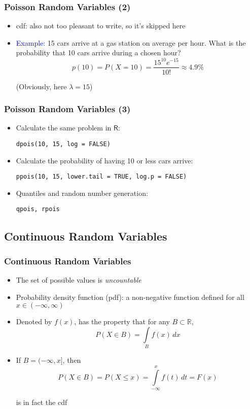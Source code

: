 \documentclass[10pt]{beamer}
\theoremstyle{definition}
\begin{document}
\begin{frame}[fragile]
\frametitle{Poisson Random Variables (2)}
\begin{itemize}
	\item cdf: also not too pleasant to write, so it's skipped here
		
	\item \textcolor{blue}{Example:} 15 cars arrive at a gas station on average per hour. What is the probability that 10 cars arrive during a chosen hour?
	\[
		p(10) = P(X = 10) = \frac{15^{10}e^{-15}}{10!} \approx 4.9\%
	\] 
		
	(Obviously, here $ \lambda = 15 $)
	\end{itemize}
\end{frame}

\begin{frame}[fragile]
\frametitle{Poisson Random Variables (3)}
\begin{itemize}
	\item Calculate the same problem in $\mathsf{R}$:
	\begin{lstlisting}[style = rstyle, breaklines]
	dpois(10, 15, log = FALSE)
	\end{lstlisting}

	\item Calculate the probability of having 10 or less cars arrive:
	\begin{lstlisting}[style = rstyle, breaklines]
	ppois(10, 15, lower.tail = TRUE, log.p = FALSE)
	\end{lstlisting}

	\item Quantiles and random number generation:
	\begin{lstlisting}[style = rstyle, breaklines]
	qpois, rpois
	\end{lstlisting}
\end{itemize}
\end{frame} 

\subsection{Continuous Random Variables}
\begin{frame}[fragile]
\frametitle{Continuous Random Variables}
\begin{itemize}
	\item The set of possible values is \textit{uncountable}
		
	\item Probability density function (pdf): a non-negative function defined for all $ x \in (-\infty, \infty) $
		
	\item Denoted by $ f(x) $, has the property that for any $ B \subset \mathbb{R} $,
	\[
		P(X \in B) = \int\limits_{B} f(x)\, dx
	\]
		
	\item If $ B = (-\infty, x]  $, then
	\[
		P(X \in B) = P (X \leq x) = \int\limits_{-\infty}^{x} f(t) \, dt = F(x)
	\]
		
	is in fact the cdf
\end{itemize}
\end{frame}
\end{document}
